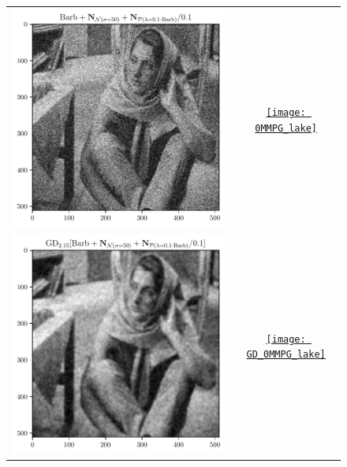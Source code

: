 \documentclass{article}
\begin{document}
\begin{figure}
{\begin{tabular}{cc}
      \href{https://nbviewer.org/github/vicente-gonzalez-ruiz/denoising/blob/main/notebooks/tau_VS_img.ipynb\#0MMPG_barb}{\includegraphics{0MMPG_barb}} & \href{https://nbviewer.org/github/vicente-gonzalez-ruiz/denoising/blob/main/figs/tau_VS_img.ipynb\#0MMPG_lake}{\texttt{[image: 0MMPG\_lake]}} \\
      \href{https://nbviewer.org/github/vicente-gonzalez-ruiz/denoising/blob/main/notebooks/tau_VS_img.ipynb\#GD_0MMPG_barb}{\includegraphics{GD_0MMPG_barb}} & \href{https://nbviewer.org/github/vicente-gonzalez-ruiz/denoising/blob/main/figs/tau_VS_img.ipynb\#GD_0MMPG_lake}{\texttt{[image: GD\_0MMPG\_lake]}}

\end{tabular}}
\end{figure}
\end{document}
